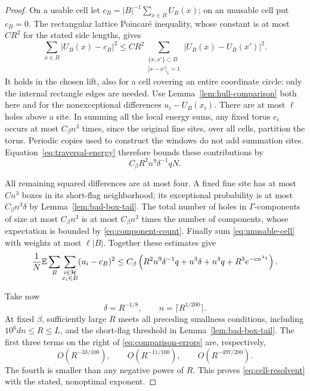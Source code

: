 \begin{proof}
On a usable cell let $c_B=|B|^{-1}\sum_{x\in B}U_B(x)$; on an
unusable cell put $c_B=0$.  The rectangular lattice Poincar\'e
inequality, whose constant is at most $CR^2$ for the stated side
lengths, gives
\[
 \sum_{x\in B}|U_B(x)-c_B|^2
 \le CR^2\sum_{\substack{\{x,x'\}\subset B\\|x-x'|_1=1}}
                  |U_B(x)-U_B(x')|^2.
\]
It holds in the chosen lift, also for a cell covering an entire
coordinate circle: only the internal rectangle edges are needed.
Use Lemma~\ref{lem:hull-comparison} both here and for the
nonexceptional differences $u_i-U_B(x_i)$.  There are at most
$\ell$ holes above a site.  In summing all the local energy
sums, any fixed torus $e_i$ occurs at most $C_\beta n^3$ times,
since the original fine sites, over all cells, partition the torus.
Periodic copies used to construct the windows do not add summation
sites.  Equation~\eqref{eq:traversal-energy} therefore bounds these
contributions by
\[
 C_\beta R^2n^9\delta^{-1}qN.
\]

All remaining squared differences are at most four.  A fixed fine
site has at most $Cn^3$ boxes in its short-flag neighborhood; its
exceptional probability is at most $C_\beta n^3\delta$ by
Lemma~\ref{lem:bad-box-tail}.  The total number of holes in
$\Gamma$-components of size at most $C_\beta n^3$ is at most
$C_\beta n^3$ times the number of components, whose expectation
is bounded by \eqref{eq:component-count}.  Finally sum
\eqref{eq:unusable-cell} with weights at most $\ell|B|$.
Together these estimates give
\begin{equation}\label{eq:comparison-errors}
 \frac1N\mathbb E\sum_B\sum_{\substack{i\in\mathcal H\\x_i\in B}}
      (u_i-c_B)^2
 \le C_\beta\left(
 R^2n^9\delta^{-1}q+n^3\delta+n^3q
                   +R^3e^{-cn^{\lambda_1}}\right).
\end{equation}

Take now
\[
 \delta=R^{-1/8},\qquad n=\lceil R^{1/200}\rceil.
\]
At fixed $\beta$, sufficiently large $R$ meets all preceding
smallness conditions, including $10^6dn\le R\le L$, and the
short-flag threshold in Lemma~\ref{lem:bad-box-tail}.  The first
three terms on the right of \eqref{eq:comparison-errors} are,
respectively,
\[
 O(R^{-33/100}),\qquad O(R^{-11/100}),\qquad
 O(R^{-497/200}).
\]
The fourth is smaller than any negative power of $R$.  This proves
\eqref{eq:cell-resolvent} with the stated, nonoptimal exponent.
\end{proof}

